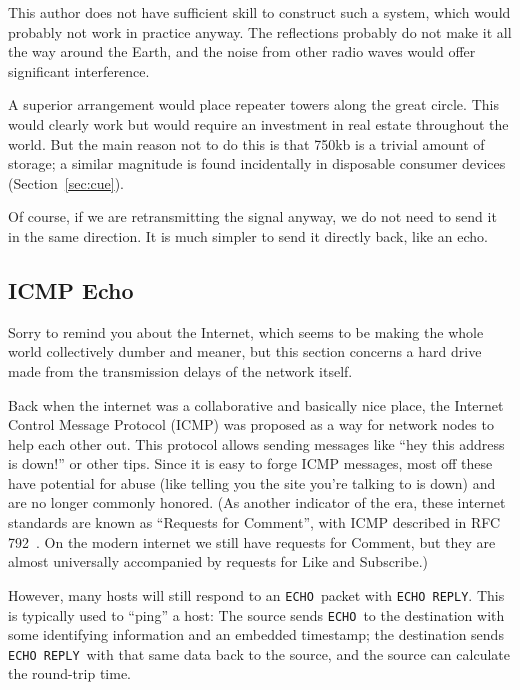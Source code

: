 \documentclass[twocolumn]{article}
\begin{document}
This author does not have sufficient skill to construct such a system,
which would probably not work in practice anyway. The reflections
probably do not make it all the way around the Earth, and the noise
from other radio waves would offer significant interference.

A superior arrangement would place repeater towers along the great
circle. This would clearly work but would require an investment in
real estate throughout the world. But the main reason not to do this
is that 750kb is a trivial amount of storage; a similar magnitude is
found incidentally in disposable consumer devices
(Section~\ref{sec:cue}).

Of course, if we are retransmitting the signal anyway, we do not need
to send it in the same direction. It is much simpler to send it
directly back, like an echo.

\subsection{ICMP Echo}

Sorry to remind you about the Internet, which seems to be making the
whole world collectively dumber and meaner, but this section concerns
a hard drive made from the transmission delays of the network itself.

Back when the internet was a collaborative and basically nice place,
the Internet Control Message Protocol (ICMP) was proposed as a way for
network nodes to help each other out. This protocol allows sending
messages like ``hey this address is down!'' or other tips. Since it is
easy to forge ICMP messages, most off these have potential for abuse
(like telling you the site you're talking to is down) and are no
longer commonly honored. (As another indicator of the era, these
internet standards are known as ``Requests for Comment'', with ICMP
described in RFC 792~\cite{rfc792}. On the modern internet we still
have requests for Comment, but they are almost universally accompanied
by requests for Like and Subscribe.)

\newcommand\icmpecho{{\tt ECHO}}
\newcommand\icmpechoreply{{\tt ECHO REPLY}}

However, many hosts will still respond to an \icmpecho\ packet with
\icmpechoreply.
This is typically used to ``ping'' a host: The source sends
\icmpecho\ to the destination with some identifying information and an
embedded timestamp; the destination sends \icmpechoreply\ with that
same data back to the source, and the source can calculate the
round-trip time.
\end{document}
